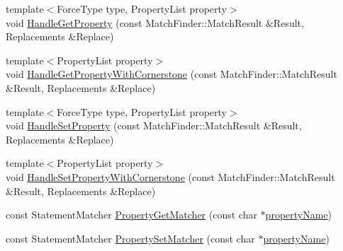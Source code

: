 \begin{DoxyCompactItemize}
\item 
{\footnotesize template$<$Force\+Type type, Property\+List property$>$ }\\void \mbox{\hyperlink{namespacews2st_1_1refactor_1_1forces_a60299eb940e8c3ed4898b7ef21f0ddce}{Handle\+Get\+Property}} (const Match\+Finder\+::\+Match\+Result \&Result, Replacements \&Replace)
\item 
{\footnotesize template$<$Property\+List property$>$ }\\void \mbox{\hyperlink{namespacews2st_1_1refactor_1_1forces_a5cb2d362d93b5e8229522853274dd8e1}{Handle\+Get\+Property\+With\+Cornerstone}} (const Match\+Finder\+::\+Match\+Result \&Result, Replacements \&Replace)
\item 
{\footnotesize template$<$Force\+Type type, Property\+List property$>$ }\\void \mbox{\hyperlink{namespacews2st_1_1refactor_1_1forces_a7fb2a369d9d5b0650f1eaecf057051d9}{Handle\+Set\+Property}} (const Match\+Finder\+::\+Match\+Result \&Result, Replacements \&Replace)
\item 
{\footnotesize template$<$Property\+List property$>$ }\\void \mbox{\hyperlink{namespacews2st_1_1refactor_1_1forces_abf74b00f35cde6816132dbefb3210684}{Handle\+Set\+Property\+With\+Cornerstone}} (const Match\+Finder\+::\+Match\+Result \&Result, Replacements \&Replace)
\item 
const Statement\+Matcher \mbox{\hyperlink{namespacews2st_1_1refactor_1_1forces_afa3a7a5edfc5f3c897623b54beec66f3}{Property\+Get\+Matcher}} (const char $\ast$\mbox{\hyperlink{namespacews2st_1_1refactor_1_1forces_a0f39ed859d2d9c4b59894fddd60b1f12}{property\+Name}})
\item 
const Statement\+Matcher \mbox{\hyperlink{namespacews2st_1_1refactor_1_1forces_a9df1170dc128f151ed5b5fedabbd15d1}{Property\+Set\+Matcher}} (const char $\ast$\mbox{\hyperlink{namespacews2st_1_1refactor_1_1forces_a0f39ed859d2d9c4b59894fddd60b1f12}{property\+Name}})
\end{DoxyCompactItemize}
